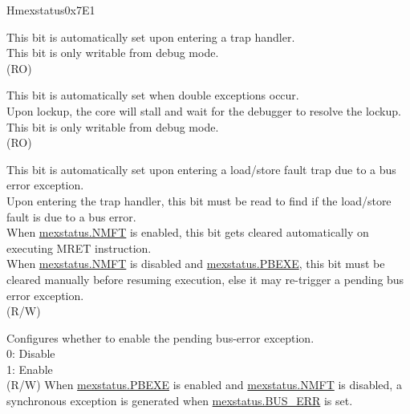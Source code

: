 \begin{register}{H}{mexstatus}{0x7E1}\label{regdesc:MEXSTATUS}%
%
%
%
%
%
%
%
%
%
%
%
%
%
\regnewline%
\begin{regdesc}\begin{reglist}
\label{fielddesc:MEXSTATUS_EXPT_VLD}\item [EXPT\_VLD] This bit is automatically set upon entering a trap handler. \\
This bit is only writable from debug mode.\\
(RO)
\label{fielddesc:MEXSTATUS_LOCKUP}\item [LOCKUP] This bit is automatically set when double exceptions occur.\\
Upon lockup, the core will stall and wait for the debugger to resolve the lockup. \\
This bit is only writable from debug mode.\\
(RO)
\label{fielddesc:MEXSTATUS_BUS_ERR}\item [BUS\_ERR] This bit is automatically set upon entering a load/store fault trap due to a bus error exception. \\
Upon entering the trap handler, this bit must be read to find if the load/store fault is due to a bus error.\\
When \hyperref[fielddesc:MEXSTATUS_NMFT]{mexstatus.NMFT} is enabled, this bit gets cleared automatically on executing MRET instruction.\\
When \hyperref[fielddesc:MEXSTATUS_NMFT]{mexstatus.NMFT} is disabled and \hyperref[fielddesc:MEXSTATUS_PBEXE]{mexstatus.PBEXE}, this bit must be cleared manually before resuming execution, else it may re-trigger a pending bus error exception.\\
(R/W)
\label{fielddesc:MEXSTATUS_PBEXE}\item [PBEXE] Configures whether to enable the pending bus-error exception. \\
0: Disable\\
1: Enable \\
(R/W)
When \hyperref[fielddesc:MEXSTATUS_PBEXE]{mexstatus.PBEXE} is enabled and \hyperref[fielddesc:MEXSTATUS_NMFT]{mexstatus.NMFT} is disabled, a synchronous exception is generated when \hyperref[fielddesc:MEXSTATUS_BUS_ERR]{mexstatus.BUS\_ERR} is set.\\

\end{reglist}
\end{regdesc}
\end{register}
